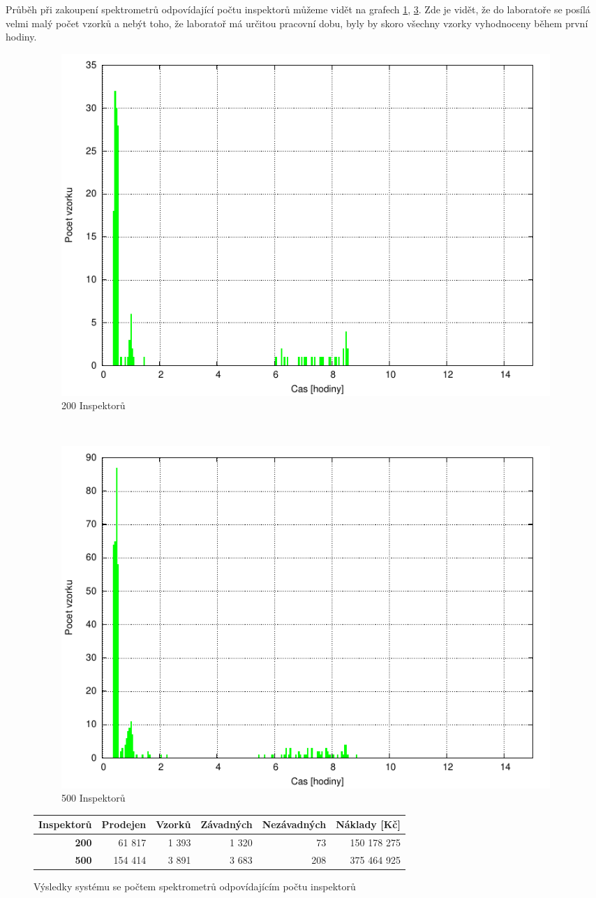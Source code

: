 \documentclass[11pt,a4paper]{article}
\begin{document}
Průběh při zakoupení spektrometrů odpovídající počtu inspektorů můžeme vidět na
grafech \ref{fulla}, \ref{fullb}. Zde je vidět, že do laboratoře se posílá
velmi malý počet vzorků a nebýt toho, že laboratoř má určitou pracovní
dobu, byly by skoro všechny vzorky vyhodnoceny během první hodiny.

\begin{figure}[h!]
  \centering
  \begin{subfigure}[t]{0.5\textwidth}
    \centering
    \includegraphics[width=\textwidth]{exp4_200}
    \caption{200 Inspektorů}
    \label{fulla}
  \end{subfigure}~\begin{subfigure}[t]{0.5\textwidth}
    \centering
    \includegraphics[width=\textwidth]{exp4_500}
    \caption{500 Inspektorů}
    \label{fullb}
  \end{subfigure}
  \begin{tabular}{|r|r|r|r|r|r|}  \hline
        \textbf{Inspektorů}&\textbf{Prodejen} & \textbf{Vzorků} & \textbf{Závadných}   
        & \textbf{Nezávadných} & \textbf{Náklady [Kč]} \\\hline
        \textbf{200}&61 817&1 393&1 320&73&150 178 275         \\\hline
        \textbf{500}&154 414&3 891&3 683&208&375 464 925         \\\hline
      \end{tabular}
      \caption{Výsledky systému se počtem spektrometrů odpovídajícím počtu inspektorů}
\end{figure} 
\end{document}
